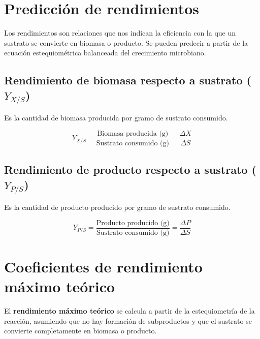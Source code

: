 

\section{Predicción de rendimientos}

Los rendimientos son relaciones que nos indican la eficiencia con la que un sustrato se convierte en biomasa o producto. Se pueden predecir a partir de la ecuación estequiométrica balanceada del crecimiento microbiano.

\subsection{Rendimiento de biomasa respecto a sustrato ($Y_{X/S}$)}
Es la cantidad de biomasa producida por gramo de sustrato consumido.

\begin{equation}
    Y_{X/S} = \frac{\text{Biomasa producida (g)}}{\text{Sustrato consumido (g)}} = \frac{\Delta X}{\Delta S}
\end{equation}

\subsection{Rendimiento de producto respecto a sustrato ($Y_{P/S}$)}
Es la cantidad de producto producido por gramo de sustrato consumido.

\begin{equation}
    Y_{P/S} = \frac{\text{Producto producido (g)}}{\text{Sustrato consumido (g)}} = \frac{\Delta P}{\Delta S}
\end{equation}


\section{Coeficientes de rendimiento máximo teórico}

El \textbf{rendimiento máximo teórico} se calcula a partir de la estequiometría de la reacción, asumiendo que no hay formación de subproductos y que el sustrato se convierte completamente en biomasa o producto.

